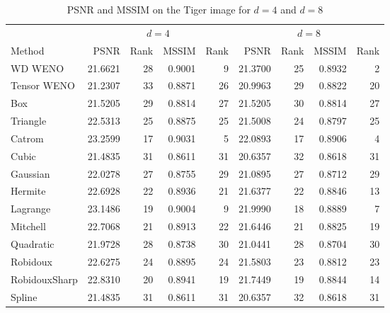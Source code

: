 	\begin{table}
		\begin{center}
			\caption{PSNR and MSSIM on the Tiger image for $d=4$ and $d=8$}
			\label{table:tiger:scale48}
			\begin{tabular}{lrrrr|rrrr}
				\hline
				& \multicolumn{4}{c}{$d=4$}& \multicolumn{4}{c}{$d=8$} \\
				Method          & PSNR      &Rank   &MSSIM      &Rank   &PSNR       &Rank   &MSSIM      &Rank  \\
				\hline
				{WD} WENO          &  21.6621  &  28  &  0.9001  &   9 &  21.3700  &  25  &  0.8932  &  2  \\
				\hline
				Tensor WENO   &  21.2307  &  33  &  0.8871  &  26 &  20.9963  &  29  &  0.8822  &  20  \\
				\hline
				Box           &  21.5205  &  29  &  0.8814  &  27 &  21.5205  &  30  &  0.8814  &  27 \\
				Triangle      &  22.5313  &  25  &  0.8875  &  25 &  21.5008  &  24  &  0.8797  &  25 \\
				\hline                                           
				Catrom        &  23.2599  &  17  &  0.9031  &   5 &  22.0893  &  17  &  0.8906  &  4  \\
				Cubic         &  21.4835  &  31  &  0.8611  &  31 &  20.6357  &  32  &  0.8618  &  31 \\
				Gaussian      &  22.0278  &  27  &  0.8755  &  29 &  21.0895  &  27  &  0.8712  &  29 \\
				Hermite       &  22.6928  &  22  &  0.8936  &  21 &  21.6377  &  22  &  0.8846  &  13 \\
				Lagrange      &  23.1486  &  19  &  0.9004  &   9 &  21.9990  &  18  &  0.8889  &  7  \\
				Mitchell      &  22.7068  &  21  &  0.8913  &  22 &  21.6446  &  21  &  0.8825  &  19 \\
				Quadratic     &  21.9728  &  28  &  0.8738  &  30 &  21.0441  &  28  &  0.8704  &  30 \\
				Robidoux      &  22.6275  &  24  &  0.8895  &  24 &  21.5803  &  23  &  0.8812  &  23 \\
				RobidouxSharp &  22.8310  &  20  &  0.8941  &  19 &  21.7449  &  19  &  0.8844  &  14 \\
				Spline        &  21.4835  &  31  &  0.8611  &  31 &  20.6357  &  32  &  0.8618  &  31 \\

\end{tabular}
\end{center}
\end{table}
